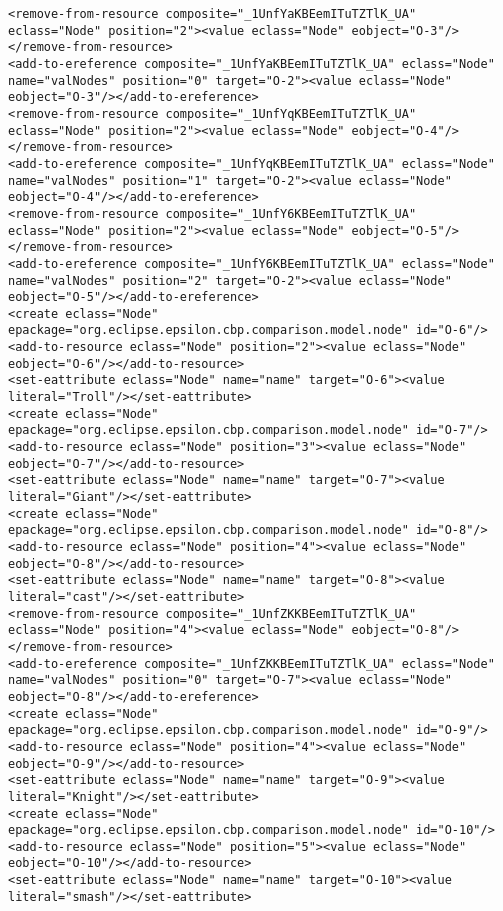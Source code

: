 \begin{lstlisting}[style=cbpfile,caption={Change-based representation of the model in Figure \ref{fig:class_diagram_left}.},label=lst:class_diagram_left_cbpfile]
<remove-from-resource composite="_1UnfYaKBEemITuTZTlK_UA" eclass="Node" position="2"><value eclass="Node" eobject="O-3"/></remove-from-resource>
<add-to-ereference composite="_1UnfYaKBEemITuTZTlK_UA" eclass="Node" name="valNodes" position="0" target="O-2"><value eclass="Node" eobject="O-3"/></add-to-ereference>
<remove-from-resource composite="_1UnfYqKBEemITuTZTlK_UA" eclass="Node" position="2"><value eclass="Node" eobject="O-4"/></remove-from-resource>
<add-to-ereference composite="_1UnfYqKBEemITuTZTlK_UA" eclass="Node" name="valNodes" position="1" target="O-2"><value eclass="Node" eobject="O-4"/></add-to-ereference>
<remove-from-resource composite="_1UnfY6KBEemITuTZTlK_UA" eclass="Node" position="2"><value eclass="Node" eobject="O-5"/></remove-from-resource>
<add-to-ereference composite="_1UnfY6KBEemITuTZTlK_UA" eclass="Node" name="valNodes" position="2" target="O-2"><value eclass="Node" eobject="O-5"/></add-to-ereference>
<create eclass="Node" epackage="org.eclipse.epsilon.cbp.comparison.model.node" id="O-6"/>
<add-to-resource eclass="Node" position="2"><value eclass="Node" eobject="O-6"/></add-to-resource>
<set-eattribute eclass="Node" name="name" target="O-6"><value literal="Troll"/></set-eattribute>
<create eclass="Node" epackage="org.eclipse.epsilon.cbp.comparison.model.node" id="O-7"/>
<add-to-resource eclass="Node" position="3"><value eclass="Node" eobject="O-7"/></add-to-resource>
<set-eattribute eclass="Node" name="name" target="O-7"><value literal="Giant"/></set-eattribute>
<create eclass="Node" epackage="org.eclipse.epsilon.cbp.comparison.model.node" id="O-8"/>
<add-to-resource eclass="Node" position="4"><value eclass="Node" eobject="O-8"/></add-to-resource>
<set-eattribute eclass="Node" name="name" target="O-8"><value literal="cast"/></set-eattribute>
<remove-from-resource composite="_1UnfZKKBEemITuTZTlK_UA" eclass="Node" position="4"><value eclass="Node" eobject="O-8"/></remove-from-resource>
<add-to-ereference composite="_1UnfZKKBEemITuTZTlK_UA" eclass="Node" name="valNodes" position="0" target="O-7"><value eclass="Node" eobject="O-8"/></add-to-ereference>
<create eclass="Node" epackage="org.eclipse.epsilon.cbp.comparison.model.node" id="O-9"/>
<add-to-resource eclass="Node" position="4"><value eclass="Node" eobject="O-9"/></add-to-resource>
<set-eattribute eclass="Node" name="name" target="O-9"><value literal="Knight"/></set-eattribute>
<create eclass="Node" epackage="org.eclipse.epsilon.cbp.comparison.model.node" id="O-10"/>
<add-to-resource eclass="Node" position="5"><value eclass="Node" eobject="O-10"/></add-to-resource>
<set-eattribute eclass="Node" name="name" target="O-10"><value literal="smash"/></set-eattribute>

\end{lstlisting}
